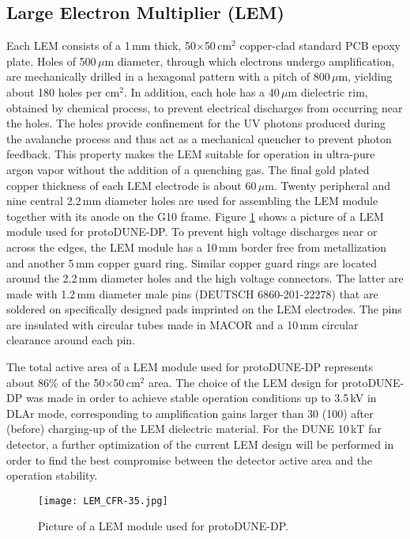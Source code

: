 \subsection{Large Electron Multiplier (LEM)}
\label{sec:fddp-crp-lem}
Each LEM consists of a 1\,mm thick, 50$\times$50\,cm$^2$ copper-clad standard PCB epoxy plate. Holes of 500\,$\mu$m diameter, through which electrons undergo amplification, are mechanically drilled in a hexagonal pattern with a pitch of 800\,$\mu$m, yielding about 180 holes per cm$^2$. In addition, each hole has a 40\,$\mu$m dielectric rim, obtained by chemical process, to prevent electrical discharges from occurring near the holes. The holes provide confinement for the UV photons produced during the avalanche process and thus act as a mechanical quencher to prevent photon feedback. This property makes the LEM suitable for operation in ultra-pure argon vapor without the addition of a quenching gas. The final gold plated copper thickness of each LEM electrode is about 60\,$\mu$m. Twenty peripheral and nine central 2.2\,mm diameter holes are used for assembling the LEM module together with its anode on the G10 frame. Figure \ref{fig:LEM_CFR-35} shows a picture of a LEM module used for protoDUNE-DP. To prevent high voltage discharges near or across the edges, the LEM module has a 10\,mm border free from metallization and another 5\,mm copper guard ring. Similar copper guard rings are located around the 2.2\,mm diameter holes and the high voltage connectors. The latter are made with 1.2\,mm diameter male pins (DEUTSCH 6860-201-22278) that are soldered on specifically designed pads imprinted on the LEM electrodes. The pins are insulated with circular tubes made in MACOR and a 10\,mm circular clearance around each pin. 

The total active area of a LEM module used for protoDUNE-DP represents about 86\% of the 50$\times$50\,cm$^2$ area. The choice of the LEM design for protoDUNE-DP was made in order to achieve stable operation conditions up to 3.5\,kV in DLAr mode, corresponding to amplification gains larger than 30 (100) after (before) charging-up of the LEM dielectric material. For the DUNE  10\,kT far detector, a further optimization of the current LEM design will  be performed in order  to find the best compromise between the detector active area and the operation stability.

\begin{figure}[h!]
  \centering
  \texttt{[image: LEM\_CFR-35.jpg]}
  \caption{Picture of a LEM module used for protoDUNE-DP.}
  \label{fig:LEM_CFR-35} 
\end{figure}

